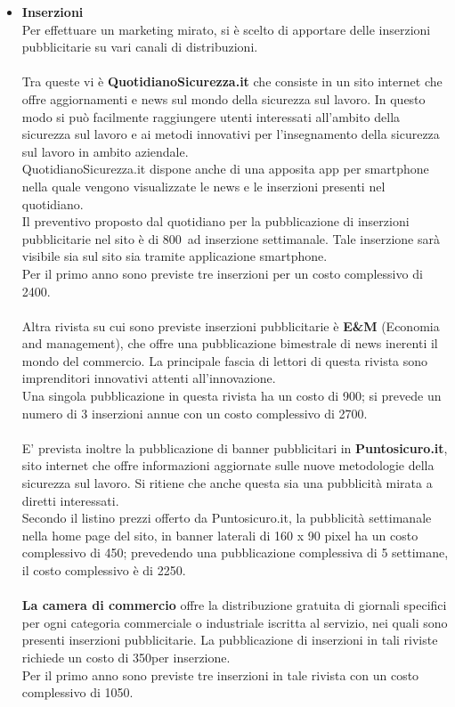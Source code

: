 \begin{itemize}
\item \textbf{Inserzioni}\\
Per effettuare un marketing mirato, si è scelto di apportare delle inserzioni pubblicitarie su vari canali di distribuzioni.
\\
\\
Tra queste vi è \textbf{QuotidianoSicurezza.it} che consiste in un sito internet che offre aggiornamenti e news sul mondo della sicurezza sul lavoro. In questo modo si può facilmente raggiungere utenti interessati all'ambito della sicurezza sul lavoro e ai metodi innovativi per l'insegnamento della sicurezza sul lavoro in ambito aziendale.\\
QuotidianoSicurezza.it dispone anche di una apposita app per smartphone nella quale vengono visualizzate le news e le inserzioni presenti nel quotidiano.\\
Il preventivo proposto dal quotidiano per la pubblicazione di inserzioni pubblicitarie nel sito è di 800\EUR\ ad inserzione settimanale. Tale inserzione sarà visibile sia sul sito sia tramite applicazione smartphone.\\ Per il primo anno sono previste tre inserzioni per un costo complessivo di 2400\EUR.
\\
\\
Altra rivista su cui sono previste inserzioni pubblicitarie è \textbf{E\&M} (Economia and management), che offre una pubblicazione bimestrale di news inerenti il mondo del commercio. La principale fascia di lettori di questa rivista sono imprenditori innovativi attenti all'innovazione.\\
Una singola pubblicazione in questa rivista ha un costo di 900\EUR; si prevede un numero di 3 inserzioni annue con un costo complessivo di 2700\EUR.
\\
\\
E' prevista inoltre la pubblicazione di banner pubblicitari in \textbf{Puntosicuro.it}, sito internet che offre informazioni aggiornate sulle nuove metodologie della sicurezza sul lavoro. Si ritiene che anche questa sia una pubblicità mirata a diretti interessati.\\
Secondo il listino prezzi offerto da Puntosicuro.it, la pubblicità settimanale nella home page del sito, in banner laterali di 160 x 90 pixel ha un costo complessivo di 450\EUR; prevedendo una pubblicazione complessiva di 5 settimane, il costo complessivo è di 2250\EUR.
\\
\\
\textbf{La camera di commercio} offre la distribuzione gratuita di giornali specifici per ogni categoria commerciale o industriale iscritta al servizio, nei quali sono presenti inserzioni pubblicitarie. La pubblicazione di inserzioni in tali riviste richiede un costo di 350\EUR per inserzione.\\
Per il primo anno sono previste tre inserzioni in tale rivista con un costo complessivo di 1050\EUR.


\end{itemize}
